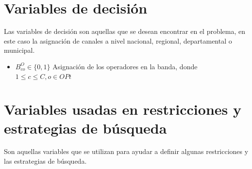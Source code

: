 \section{Variables de decisión}

Las variables de decisión son aquellas que se desean encontrar en el problema, en este caso la asignación de canales a nivel nacional, regional, departamental o municipal.

\begin{itemize}
	\item ${B}^{O}_{co} \in \{0,1\}$ Asignación de los operadores en la banda, donde $1 \leq c \leq C, o \in OPt$
\end{itemize}


\section{Variables usadas en restricciones y estrategias de búsqueda}

Son aquellas variables que se utilizan para ayudar a definir algunas restricciones y las estrategias de búsqueda.


